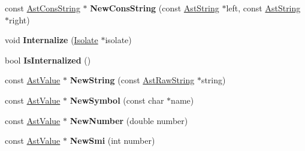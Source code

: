 \begin{DoxyCompactItemize}
\item 
\hypertarget{classv8_1_1internal_1_1_ast_value_factory_a97eccad8901b4bdfa0cc00d4a133f6f3}{}const \hyperlink{classv8_1_1internal_1_1_ast_cons_string}{Ast\+Cons\+String} $\ast$ {\bfseries New\+Cons\+String} (const \hyperlink{classv8_1_1internal_1_1_ast_string}{Ast\+String} $\ast$left, const \hyperlink{classv8_1_1internal_1_1_ast_string}{Ast\+String} $\ast$right)\label{classv8_1_1internal_1_1_ast_value_factory_a97eccad8901b4bdfa0cc00d4a133f6f3}

\item 
\hypertarget{classv8_1_1internal_1_1_ast_value_factory_a5deb8e954fe78ec1910d5fe494e602d3}{}void {\bfseries Internalize} (\hyperlink{classv8_1_1internal_1_1_isolate}{Isolate} $\ast$isolate)\label{classv8_1_1internal_1_1_ast_value_factory_a5deb8e954fe78ec1910d5fe494e602d3}

\item 
\hypertarget{classv8_1_1internal_1_1_ast_value_factory_ad4d40aa31bd431a57a985f9c87242ed9}{}bool {\bfseries Is\+Internalized} ()\label{classv8_1_1internal_1_1_ast_value_factory_ad4d40aa31bd431a57a985f9c87242ed9}

\item 
\hypertarget{classv8_1_1internal_1_1_ast_value_factory_acc10654c4900ddf6c9df0eb0db570c5d}{}const \hyperlink{classv8_1_1internal_1_1_ast_value}{Ast\+Value} $\ast$ {\bfseries New\+String} (const \hyperlink{classv8_1_1internal_1_1_ast_raw_string}{Ast\+Raw\+String} $\ast$string)\label{classv8_1_1internal_1_1_ast_value_factory_acc10654c4900ddf6c9df0eb0db570c5d}

\item 
\hypertarget{classv8_1_1internal_1_1_ast_value_factory_ae532fb5eee98a9b1aca33b08241b4798}{}const \hyperlink{classv8_1_1internal_1_1_ast_value}{Ast\+Value} $\ast$ {\bfseries New\+Symbol} (const char $\ast$name)\label{classv8_1_1internal_1_1_ast_value_factory_ae532fb5eee98a9b1aca33b08241b4798}

\item 
\hypertarget{classv8_1_1internal_1_1_ast_value_factory_a8f65cf3651fb792b1c3551c7b29a5b9b}{}const \hyperlink{classv8_1_1internal_1_1_ast_value}{Ast\+Value} $\ast$ {\bfseries New\+Number} (double number)\label{classv8_1_1internal_1_1_ast_value_factory_a8f65cf3651fb792b1c3551c7b29a5b9b}

\item 
\hypertarget{classv8_1_1internal_1_1_ast_value_factory_a946e0af513192f073660d80e03a904d8}{}const \hyperlink{classv8_1_1internal_1_1_ast_value}{Ast\+Value} $\ast$ {\bfseries New\+Smi} (int number)\label{classv8_1_1internal_1_1_ast_value_factory_a946e0af513192f073660d80e03a904d8}


\end{DoxyCompactItemize}
